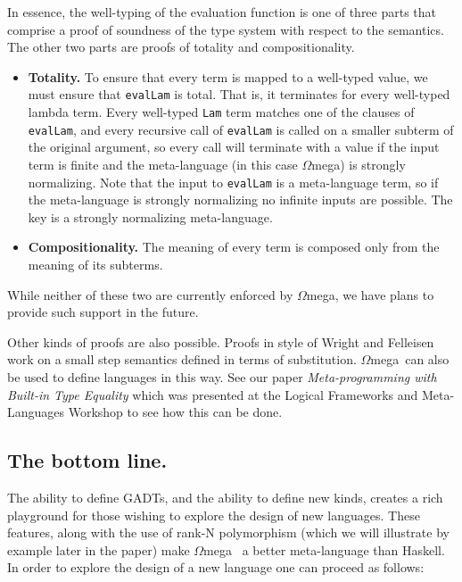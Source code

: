 \documentclass{sigplanconf}
\newcommand{\om}{$\Omega$mega}
\begin{document}
In essence, the well-typing of the evaluation function is one of three parts
that comprise a proof of soundness of the type system with respect to the
semantics. The other two parts are proofs of totality and
compositionality.

\begin{itemize} 

\item{\bf Totality.} To ensure that every term is mapped to a well-typed value,
we must ensure that {\tt evalLam} is total. That is, it terminates for every
well-typed lambda term. Every well-typed {\tt Lam} term matches one of the
clauses of {\tt evalLam}, and every recursive call of {\tt evalLam} is called
on a smaller subterm of the original argument, so every call will terminate
with a value if the input term is finite and the meta-language (in this case
\om) is strongly normalizing. Note that the input to {\tt evalLam} is
a meta-language term, so if the meta-language is strongly normalizing
no infinite inputs are possible. The key is a strongly normalizing
meta-language.

\item {\bf Compositionality.} The meaning of every term is composed
only from the meaning of its subterms.

\end{itemize}

While neither of these two are currently enforced by \om, we have plans
to provide such support in the future.

Other kinds of proofs are also
possible. Proofs in style of Wright and
Felleisen\cite{Wright:94} work on a small step semantics defined in terms of
substitution. \om\ can also be used to define languages in this way. See our
paper {\em Meta-programming with Built-in Type Equality}\cite{SheardLogFrWks04}
which was presented at the Logical Frameworks and Meta-Languages Workshop to
see how this can be done.

\subsection{The bottom line.}

The ability to define GADTs, and the ability to define new kinds,
creates a rich playground for those wishing to explore the design of new
languages. These features, along with the use of rank-N polymorphism (which we
will illustrate by example later in the paper) make \om~ a better meta-language
than Haskell. In order to explore the design of a new language one 
can proceed as follows:
\end{document}
